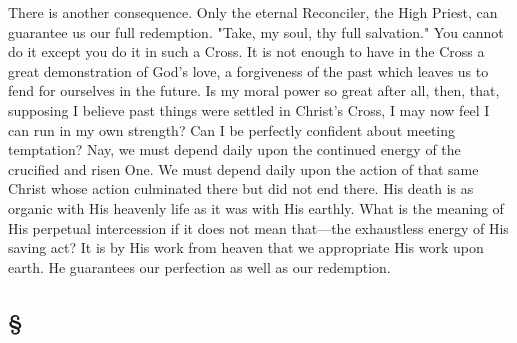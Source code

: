 \documentclass[draft]{ptfdoc}
\begin{document}
There is another consequence. Only the 
eternal Reconciler, the High Priest, can 
guarantee us our full redemption. "Take, my 
soul, thy full salvation." You cannot do it 
except you do it in such a Cross. It is not 
enough to have in the Cross a great demonstration 
of God's love, a forgiveness of the 
past which leaves us to fend for ourselves in 
the future. Is my moral power so great after 
all, then, that, supposing I believe past things 
were settled in Christ's Cross, I may now feel 
I can run in my own strength? Can I be 
perfectly confident about meeting temptation? 
Nay, we must depend daily upon the continued 
energy of the crucified and risen One. We 
must depend daily upon the action of that 
same Christ whose action culminated there 
but did not end there. His death is as organic 
with His heavenly life as it was with His 
earthly. What is the meaning of His perpetual 
intercession if it does not mean that---the 
exhaustless energy of His saving act? It is 
by His work from heaven that we appropriate 
His work upon earth. He guarantees our perfection 
as well as our redemption. 

\subsection*{
\S
}
\end{document}
